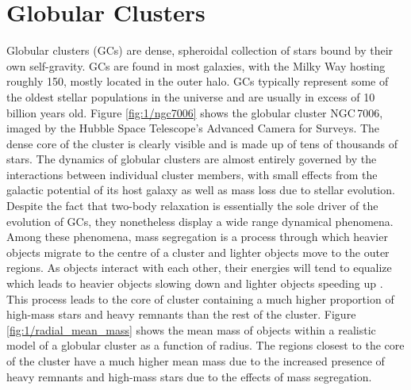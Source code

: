 
\section{Globular Clusters}


Globular clusters (GCs) are dense, spheroidal collection of stars bound by their own self-gravity.
GCs are found in most galaxies, with the Milky Way hosting roughly 150, mostly located in the outer
halo. GCs typically represent some of the oldest stellar populations in the universe and are usually
in excess of 10 billion years old. Figure \ref{fig:1/ngc7006} shows the globular cluster NGC\,7006,
imaged by the Hubble Space Telescope's Advanced Camera for Surveys. The dense core of the cluster is
clearly visible and is made up of tens of thousands of stars. The dynamics of globular clusters are
almost entirely governed by the interactions between individual cluster members, with small effects
from the galactic potential of its host galaxy as well as mass loss due to stellar evolution.
Despite the fact that two-body relaxation is essentially the sole driver of the evolution of GCs,
they nonetheless display a wide range dynamical phenomena. Among these phenomena, mass segregation
is a process through which heavier objects migrate to the centre of a cluster and lighter objects
move to the outer regions. As objects interact with each other, their energies will tend to equalize
which leads to heavier objects slowing down and lighter objects speeding up \citep{Heggie2003}. This
process leads to the core of cluster containing a much higher proportion of high-mass stars and
heavy remnants than the rest of the cluster. Figure \ref{fig:1/radial_mean_mass} shows the mean mass
of objects within a realistic model of a globular cluster as a function of radius. The regions
closest to the core of the cluster have a much higher mean mass due to the increased presence of
heavy remnants and high-mass stars due to the effects of mass segregation.

